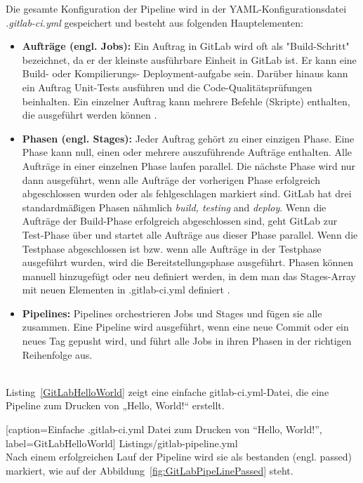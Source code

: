 Die gesamte Konfiguration der Pipeline wird in der YAML-Konfigurationsdatei \textit{.gitlab-ci.yml} gespeichert und besteht aus folgenden Hauptelementen:

\begin{itemize}
	
	\item \textbf{Aufträge (engl. Jobs):} Ein Auftrag in GitLab wird oft als "Build-Schritt" bezeichnet, da er der kleinste ausführbare Einheit in GitLab ist. Er kann eine Build- oder Kompilierungs- Deployment-aufgabe sein. Darüber hinaus kann ein Auftrag Unit-Tests ausführen und die Code-Qualitätsprüfungen beinhalten. Ein einzelner Auftrag kann mehrere Befehle (Skripte) enthalten, die ausgeführt werden können \cite{GitLab:jobs}.
	
	\item \textbf{Phasen (engl. Stages):} Jeder Auftrag gehört zu einer einzigen Phase. Eine Phase kann null, einen oder mehrere auszuführende Aufträge enthalten. Alle Aufträge in einer einzelnen Phase laufen parallel. Die nächste Phase wird nur dann ausgeführt, wenn alle Aufträge der vorherigen Phase erfolgreich abgeschlossen wurden oder als fehlgeschlagen markiert sind.
	GitLab hat drei standardmäßigen Phasen nähmlich \textit{build, testing} and \textit{deploy}. Wenn die Aufträge der Build-Phase erfolgreich abgeschlossen sind, geht GitLab zur Test-Phase über und startet alle Aufträge aus dieser Phase parallel. Wenn die Testphase abgeschlossen ist bzw. wenn alle Aufträge in der Testphase ausgeführt wurden, wird die Bereitstellungsphase ausgeführt. Phasen können manuell hinzugefügt oder neu definiert werden, in dem man das Stages-Array mit neuen Elementen in .gitlab-ci.yml definiert \cite{GitLab:stages}.
	
	\item \textbf{Pipelines:} Pipelines orchestrieren Jobs und Stages und fügen sie alle zusammen. Eine Pipeline wird ausgeführt, wenn eine neue Commit oder ein neues Tag gepusht wird, und führt alle Jobs in ihren Phasen in der richtigen Reihenfolge aus.
	
\end{itemize}
\ \\
Listing~\ref{GitLabHelloWorld} zeigt eine einfache gitlab-ci.yml-Datei, die eine Pipeline zum Drucken von „Hello, World!“ erstellt.


[caption={Einfache .gitlab-ci.yml Datei zum Drucken von “Hello, World!”}, label=GitLabHelloWorld]
{Listings/gitlab-pipeline.yml}
\ \\
Nach einem erfolgreichen Lauf der Pipeline wird sie als bestanden (engl. passed) markiert, wie auf der Abbildung~\ref{fig:GitLabPipeLinePassed} steht.

